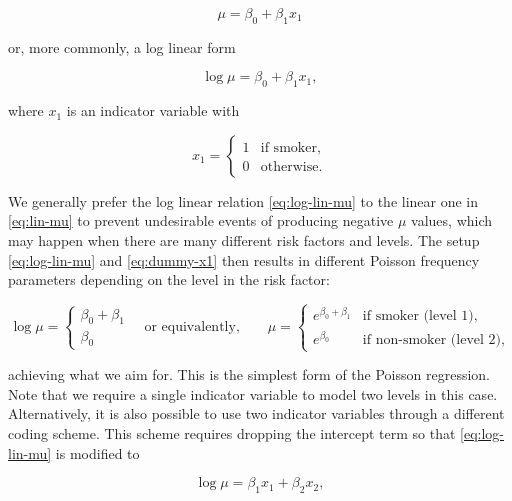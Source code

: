 \documentclass[]{book}
\theoremstyle{definition}
\theoremstyle{definition}
\theoremstyle{definition}
\theoremstyle{remark}
\begin{document}
\begin{equation}
\mu=\beta_0+\beta_1 x_1
\label{eq:lin-mu}
\end{equation}

or, more commonly, a log linear form

\begin{equation}
\log \mu=\beta_0+\beta_1 x_1,
\label{eq:log-lin-mu}
\end{equation}

where \(x_1\) is an indicator variable with

\begin{equation}
x_1=
\begin{cases}
     1 & \text{if smoker}, \\
     0 & \text{otherwise}.
\end{cases}
\label{eq:dummy-x1}
\end{equation}

We generally prefer the log linear relation \eqref{eq:log-lin-mu} to the
linear one in \eqref{eq:lin-mu} to prevent undesirable events of producing
negative \(\mu\) values, which may happen when there are many different
risk factors and levels. The setup \eqref{eq:log-lin-mu} and
\eqref{eq:dummy-x1} then results in different Poisson frequency parameters
depending on the level in the risk factor:

\begin{equation}
\log \mu=
\begin{cases}
     \beta_0+\beta_1 \\
     \beta_0 
\end{cases}
\quad \text{or equivalently,}\qquad \mu= \begin{cases}
     e^{\beta_0+\beta_1} & \text{if smoker (level 1)}, \\
     e^{\beta_0} & \text{if non-smoker (level 2)},
\end{cases} 
\label{eq:ind-mu}
\end{equation}

achieving what we aim for. This is the simplest form of the Poisson
regression. Note that we require a single indicator variable to model
two levels in this case. Alternatively, it is also possible to use two
indicator variables through a different coding scheme. This scheme
requires dropping the intercept term so that \eqref{eq:log-lin-mu} is
modified to

\begin{equation}
\log \mu=\beta_1 x_1+\beta_2 x_2,
\label{eq:log-lin-mu-2}
\end{equation}
\end{document}
